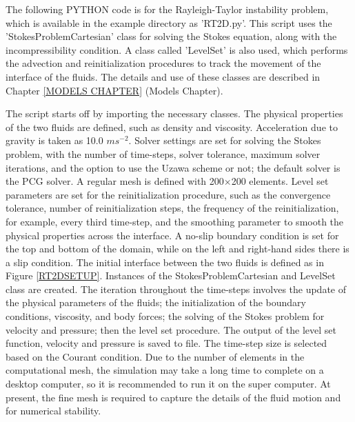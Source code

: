 %
%
The following PYTHON code is for the Rayleigh-Taylor instability problem, which is available in the example directory as 'RT2D.py'. This script uses the 'StokesProblemCartesian' class for solving the Stokes equation, along with the incompressibility condition. A class called 'LevelSet' is also used, which performs the advection and reinitialization procedures to track the movement of the interface of the fluids. The details and use of these classes are described in Chapter \ref{MODELS CHAPTER} (Models Chapter).

The script starts off by importing the necessary classes. The physical properties of the two fluids are defined, such as density and viscosity. Acceleration due to gravity is taken as 10.0 $ms^{-2}$. Solver settings are set for solving the Stokes problem, with the number of time-steps, solver tolerance, maximum solver iterations, and the option to use the Uzawa scheme or not; the default solver is the PCG solver. A regular mesh is defined with 200$\times$200 elements. Level set parameters are set for the reinitialization procedure, such as the convergence tolerance, number of reinitialization steps, the frequency of the reinitialization, for example, every third time-step, and the smoothing parameter to smooth the physical properties across the interface. A no-slip boundary condition is set for the top and bottom of the domain, while on the left and right-hand sides there is a slip condition. The initial interface between the two fluids is defined as in Figure \ref{RT2DSETUP}. Instances of the StokesProblemCartesian and LevelSet class are created. The iteration throughout the time-steps involves the update of the physical parameters of the fluids; the initialization of the boundary conditions, viscosity, and body forces; the solving of the Stokes problem for velocity and pressure; then the level set procedure. The output of the level set function, velocity and pressure is saved to file. The time-step size is selected based on the Courant condition. Due to the number of elements in the computational mesh, the simulation may take a long time to complete on a desktop computer, so it is recommended to run it on the super computer. At present, the fine mesh is required to capture the details of the fluid motion and for numerical stability.  
%
